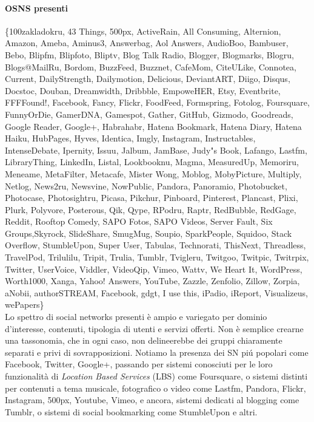 \paragraph{OSNS presenti}
\{100zakladokru, 43 Things, 500px, ActiveRain, All Consuming, Alternion, Amazon, Ameba, Aminus3, Answerbag, Aol Answers, AudioBoo, Bambuser, Bebo, Blipfm, Blipfoto, Bliptv, Blog Talk Radio, Blogger, Blogmarks, Blogru, Blogs@MailRu, Bordom, BuzzFeed, Buzznet, CafeMom, CiteULike, Connotea, Current, DailyStrength, Dailymotion, Delicious, DeviantART, Diigo, Disqus, Docstoc, Douban, Dreamwidth, Dribbble, EmpoweHER, Etsy, Eventbrite, FFFFound!, Facebook, Fancy, Flickr, FoodFeed, Formspring, Fotolog, Foursquare, FunnyOrDie, GamerDNA, Gamespot, Gather, GitHub, Gizmodo, Goodreads, Google Reader, Google+, Habrahabr, Hatena Bookmark, Hatena Diary, Hatena Haiku, HubPages, Hyves, Identica, Imgly, Instagram, Instructables, IntenseDebate, Ipernity, Issuu, Jalbum, JamBase, Judy"s Book, Lafango, Lastfm, LibraryThing, LinkedIn, Listal, Lookbooknu, Magma, MeasuredUp, Memoriru, Meneame, MetaFilter, Metacafe, Mister Wong, Moblog, MobyPicture, Multiply, Netlog, News2ru, Newsvine, NowPublic, Pandora, Panoramio, Photobucket, Photocase, Photosightru, Picasa, Pikchur, Pinboard, Pinterest, Plancast, Plixi, Plurk, Polyvore, Posterous, Qik, Qype, RPodru, Raptr, RedBubble, RedGage, Reddit, Rooftop Comedy, SAPO Fotos, SAPO Videos, Server Fault, Six Groups,Skyrock, SlideShare, SmugMug, Soupio, SparkPeople, Squidoo, Stack Overflow, StumbleUpon, Super User, Tabulas, Technorati, ThisNext, Threadless, TravelPod, Trilulilu, Tripit, Trulia, Tumblr, Tvigleru, Twitgoo, Twitpic, Twitrpix, Twitter, UserVoice, Viddler, VideoQip, Vimeo, Wattv, We Heart It, WordPress, Worth1000, Xanga, Yahoo! Answers, YouTube, Zazzle, Zenfolio, Zillow, Zorpia, aNobii, authorSTREAM, Facebook, gdgt, I use this, iPadio, iReport, Visualizeus, wePapers\} \\

Lo spettro di social networks presenti è ampio e variegato per dominio d'interesse, contenuti, tipologia di utenti e servizi offerti. Non è semplice crearne una tassonomia, che in ogni caso, non delineerebbe dei gruppi chiaramente separati e privi di sovrapposizioni. Notiamo la presenza dei SN piú popolari come Facebook, Twitter, Google+,
passando per sistemi conosciuti per le loro funzionalità di \textit{Location Based Services} (LBS) come Foursquare, o sistemi distinti per contenuti a tema musicale, fotografico o video come Lastfm, Pandora, Flickr, Instagram, 500px, Youtube, Vimeo, e ancora, sistemi dedicati al blogging come Tumblr, o sistemi di social bookmarking come StumbleUpon e altri.


